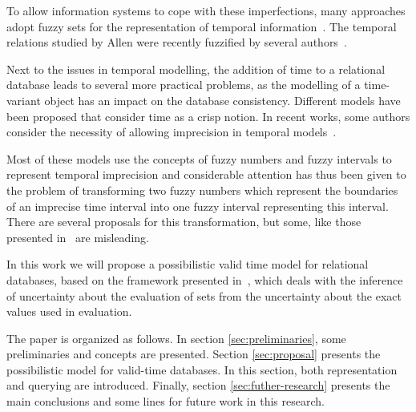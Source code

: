 To allow information systems to cope with these imperfections, many approaches adopt fuzzy sets for the representation of temporal information~\cite{Billiet:Pons:Matthe:DeTre:Pons:2011:BipolarFuzzy,Dubois:jucs_9_9:fuzziness_and_uncertainty_in}. The temporal relations studied by Allen were recently fuzzified by several authors~\cite{ohlbach04,schockaert08}.


Next to the issues in temporal modelling, the addition of time to a relational database leads to several more practical problems, as the modelling of a time-variant object has an impact on the database consistency. Different models have been proposed \cite{Jensen91,Snodgrass84,Nascimento95} that consider time as a crisp notion. In recent works, some authors consider the necessity of allowing imprecision in temporal models~\cite{Cru97,Garrido2009}.

Most of these models use the concepts of fuzzy numbers and fuzzy intervals to represent temporal imprecision and considerable attention has thus been given to the problem of transforming two fuzzy numbers which represent the boundaries of an imprecise time interval into one fuzzy interval representing this interval. There are several proposals for this transformation, but some, like those presented in~\cite{Garrido2009} are misleading. 

In this work we will propose a possibilistic valid time model for relational databases, based on the framework presented in~\cite{Pon11}, which deals with the inference of uncertainty about the evaluation of sets from the uncertainty about the exact values used in evaluation. 

The paper is organized as follows. In section \ref{sec:preliminaries}, some preliminaries and concepts are presented. 
Section \ref{sec:proposal} presents the possibilistic model for valid-time databases. In this section, both representation and querying are introduced.
Finally, section \ref{sec:futher-research} presents the main conclusions and some lines for future work in this research.